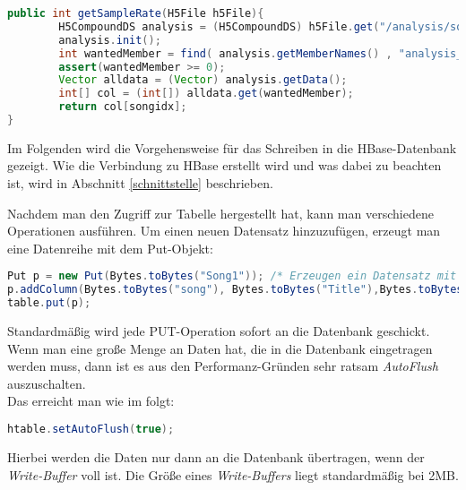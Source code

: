 \begin{lstlisting}[language=Java]
public int getSampleRate(H5File h5File){
        H5CompoundDS analysis = (H5CompoundDS) h5File.get("/analysis/songs");
        analysis.init();
        int wantedMember = find( analysis.getMemberNames() , "analysis_sample_rate");
        assert(wantedMember >= 0);
        Vector alldata = (Vector) analysis.getData();
        int[] col = (int[]) alldata.get(wantedMember);
        return col[songidx];
}
\end{lstlisting}

Im Folgenden wird die Vorgehensweise für das Schreiben in die HBase-Datenbank gezeigt. Wie die Verbindung zu HBase erstellt wird und was dabei zu beachten ist, wird in Abschnitt \ref{schnittstelle} beschrieben.

Nachdem man den Zugriff zur Tabelle hergestellt hat, kann man verschiedene Operationen ausführen.
Um einen neuen Datensatz hinzuzufügen, erzeugt man eine Datenreihe mit dem Put-Objekt:

\begin{lstlisting}[language=Java]
Put p = new Put(Bytes.toBytes("Song1")); /* Erzeugen ein Datensatz mit dem RowKey = "Song1'' */
p.addColumn(Bytes.toBytes("song"), Bytes.toBytes("Title"),Bytes.toBytes("HISTORY")); /* Erzeuge fuer diesen RowKey inder Spaltenfamileie "Song" die Splate "Title" mit dem Wert "HISTORY" */
table.put(p);
\end{lstlisting}

Standardmäßig wird jede PUT-Operation sofort an die Datenbank geschickt. Wenn man eine große Menge an Daten hat, die in die Datenbank eingetragen werden muss, dann ist es aus den Performanz-Gründen sehr ratsam \textit{AutoFlush} auszuschalten. \\
Das erreicht man wie im folgt:
\begin{lstlisting}[language=Java]
htable.setAutoFlush(true);
\end{lstlisting}
Hierbei werden die Daten nur dann an die Datenbank übertragen, wenn der \textit{Write-Buffer} voll ist. Die Größe eines \textit{Write-Buffers} liegt standardmäßig bei 2MB. 



